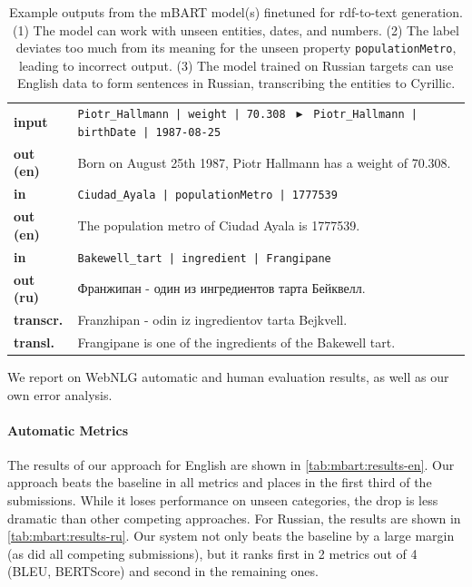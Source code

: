 \begin{table}[t]
    \footnotesize
    \centering
    \begin{tabular}{@{}lp{12.7cm}@{}}
        \textbf{input}    & \texttt{Piotr\_Hallmann | weight | 70.308 }  $\blacktriangleright$ \texttt{ Piotr\_Hallmann | birthDate | 1987-08-25} \\
        \textbf{out (en)} & Born on August 25th 1987, Piotr Hallmann has a weight of 70.308.                                                      \\
        \midrule
        \textbf{in}       & \texttt{Ciudad\_Ayala | populationMetro | 1777539}                                                                    \\
        \textbf{out (en)} & The population metro of Ciudad Ayala is 1777539.                                                                      \\
        \midrule
        \textbf{in}       & \texttt{Bakewell\_tart | ingredient | Frangipane}                                                                     \\
        \textbf{out (ru)} & Франжипан - один из ингредиентов тарта Бейквелл.                                                                      \\[0.1cm]
        \textbf{transcr.} & Franzhipan - odin iz ingredientov tarta Bejkvell.                                                                     \\
        \textbf{transl.}  & Frangipane is one of the ingredients of the Bakewell tart.                                                            \\
    \end{tabular}
    \caption{Example outputs from the mBART model(s) finetuned for \ac{rdf}-to-text generation. (1) The model can work with unseen entities, dates, and numbers. (2) The label deviates too much from its meaning for the unseen property \texttt{populationMetro}, leading to incorrect output. (3) The model trained on Russian targets can use English data to form sentences in Russian, transcribing the entities to Cyrillic.}
    \label{tab:mbart:examples}
\end{table}

We report on WebNLG automatic and human evaluation results, as well as our own error analysis.

\paragraph{Automatic Metrics}
The results of our approach for English are shown in \autoref{tab:mbart:results-en}. Our approach beats the baseline in all metrics and places in the first third of the submissions. While it loses performance on unseen categories, the drop is less dramatic than other competing approaches. For Russian, the results are shown in \autoref{tab:mbart:results-ru}. Our system not only beats the baseline by a large margin (as did all competing submissions), but it ranks first in 2 metrics out of 4 (BLEU, BERTScore) and second in the remaining ones.


